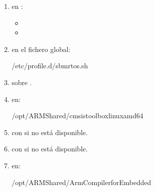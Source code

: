 \documentclass[letterpaper,10pt,english]{sphinxmanual}
\begin{document}
\begin{enumerate}
%
\item {} 
\sphinxAtStartPar
{} en :
\begin{itemize}
\item {} 
\sphinxAtStartPar
{}

\item {} 
\sphinxAtStartPar
{}

\end{itemize}

\item {} 
\sphinxAtStartPar
{} en el fichero global:

\begin{sphinxVerbatim}[commandchars=\\\{\}]
/etc/profile.d/sbm\PYGZhy{}rtos.sh
\end{sphinxVerbatim}

\item {} 
\sphinxAtStartPar
{} sobre .

\item {} 
\sphinxAtStartPar
{} en:

\begin{sphinxVerbatim}[commandchars=\\\{\}]
/opt/ARM\PYGZhy{}Shared/cmsis\PYGZhy{}toolbox\PYGZhy{}linux\PYGZhy{}amd64
\end{sphinxVerbatim}

\item {} 
\sphinxAtStartPar
{} con  si no está disponible.

\item {} 
\sphinxAtStartPar
{} con  si no está disponible.

\item {} 
\sphinxAtStartPar
{} en:

\begin{sphinxVerbatim}[commandchars=\\\{\}]
/opt/ARM\PYGZhy{}Shared/ArmCompilerforEmbedded
\end{sphinxVerbatim}


\end{enumerate}
\end{document}
